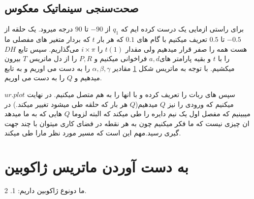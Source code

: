 \documentclass{article}
\begin{document}
\subsection{صحت‌سنجی سینماتیک معکوس}
برای راستی ازمایی یک  درست کرده ایم که $q_1$ از $-90$ تا $90$  درجه میرود.
یک حلقه از  $-0.5$ تا $0.5$ تعریف میکنیم با گام های $0.1$ که هر بار $t$ که بردار متغیر های مفصلی ما هست همه را صفر قرار میدهیم ولی مقدار $t(1)$ را  $i\times\pi$ می‌گذاریم. سپس تابع $DH$ را با $t$ و بقیه پارامتر های$a, d$ فراخوانی میکنیم و $P, R$ را از دل ماتریس $T$ بیرون میکشیم.
با توجه به ماتریس شکل \ref{fig:formula223} مقادیر $\alpha, \beta, \gamma$ را به دست می اوریم و به تابع   میدهیم و $Q$ را به دست می اوریم.
\\
\begin{figure}[H]%
	\centering
    \caption{\label{fig:formula223}}
\end{figure}
\noindent
سپس  های ربات را تعریف کرده و با  انها را به هم متصل میکنیم. در نهایت $ur.plot$  میکنیم که ورودی را نیز $Q$ میدهیم($Q$ هر بار که حلقه طی میشود تغییر میکند.)
در میبینیم که مفصل اول یک نیم دایره را طی میکند که البته لزوما $Q$ هایی که به ما میدهد ان چیزی نیست که ما فکر میکنیم چون به هر نقطه در فضای کاری میتوان با چند جهت گیری رسید.مهم این است که مسیر مورد نظر مارا طی میکند.



\section{به دست آوردن ماتریس ژاکوبین}
ما دونوع ژاکوبین داریم: 1.  2. 
\end{document}
